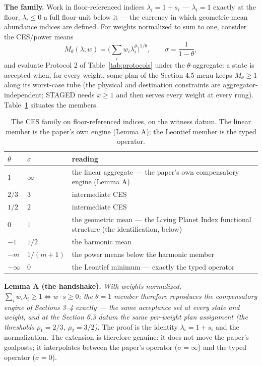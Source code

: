 \documentclass[3p,11pt]{elsarticle}
\begin{document}
\textbf{The family.} Work in floor-referenced indices
\(\lambda_i = 1 + s_i\) --- \(\lambda_i = 1\) exactly at the floor,
\(\lambda_i \le 0\) a full floor-unit below it --- the currency in
which geometric-mean abundance indices are defined. For weights normalized
to sum to one, consider the CES/power means
\[M_\theta(\lambda; w) = \Big( \textstyle\sum_i w_i \lambda_i^\theta \Big)^{1/\theta},
\qquad \sigma = \frac{1}{1-\theta},\]
and evaluate Protocol 2 of Table~\ref{tab:protocols} under the
\(\theta\)-aggregate: a state is accepted when, for every weight, some
plan of the Section 4.5 menu keeps \(M_\theta \ge 1\) along its
worst-case tube (the physical and destination constraints are
aggregator-independent; STAGED needs \(x \ge 1\) and then serves every
weight at every rung). Table~\ref{tab:sigmafamily} situates the members.

\begin{table}[htbp]
\centering
\small
\caption{The CES family on floor-referenced indices, on the witness
datum. The linear member is the paper's own engine (Lemma A); the
Leontief member is the typed operator.}
\label{tab:sigmafamily}
\begin{tabular}{@{}llp{7.4cm}@{}}
\toprule
\(\theta\) & \(\sigma\) & reading \\
\midrule
\(1\) & \(\infty\) & the linear aggregate --- the paper's own compensatory engine (Lemma A) \\
\(2/3\) & \(3\) & intermediate CES \\
\(1/2\) & \(2\) & intermediate CES \\
\(0\) & \(1\) & the geometric mean --- the Living Planet Index functional structure (the identification, below) \\
\(-1\) & \(1/2\) & the harmonic mean \\
\(-m\) & \(1/(m+1)\) & the power means below the harmonic member \\
\(-\infty\) & \(0\) & the Leontief minimum --- exactly the typed operator \\
\bottomrule
\end{tabular}
\end{table}

\textbf{Lemma A (the handshake).} \emph{With weights normalized,
\(\sum_i w_i \lambda_i \ge 1 \iff w \cdot s \ge 0\); the
\(\theta = 1\) member therefore reproduces the compensatory engine of
Sections 3--4 exactly --- the same acceptance set at every state and
weight, and at the Section 6.3 datum the same per-weight plan assignment
(the thresholds \(\rho_1 = 2/3\), \(\rho_2 = 3/2\)).} The proof is
the identity \(\lambda_i = 1 + s_i\) and the normalization. The
extension is therefore genuine: it does not move the paper's goalposts;
it interpolates between the paper's operator (\(\sigma = \infty\))
and the typed operator (\(\sigma = 0\)).
\end{document}
